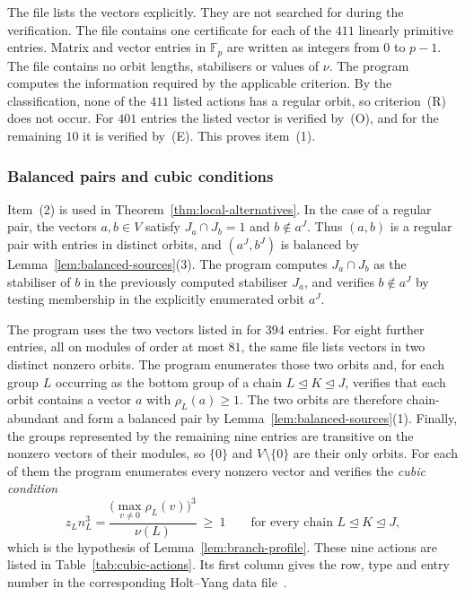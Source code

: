 \documentclass[10pt]{amsart}
\theoremstyle{definition}
\renewcommand{\ge}{\geqslant}
\renewcommand{\geq}{\geqslant}
\let\oldendproof\endproof
\renewenvironment{proof}[1][\proofname]{%
  \oldproof[\bfseries #1]%
}{\oldendproof}
\numberwithin{equation}{section}
\numberwithin{table}{section}
\begin{document}
\begin{proof}
The file  lists the vectors explicitly. They are
not searched for during the verification. The file contains one certificate for
each of the $411$ linearly primitive entries. Matrix and
vector entries in $\mathbb{F}_p$ are written as integers from $0$ to $p-1$.
The file contains no orbit lengths, stabilisers or values of
$\nu$. The program computes the information required by the applicable
criterion.
By the classification, none of the $411$ listed actions has a
regular orbit, so criterion~(R) does not occur. For $401$ entries the listed vector is
verified by~(O), and for the remaining $10$ it is verified by~(E). This proves
item~(1).

\subsubsection*{Balanced pairs and cubic conditions}
Item~(2) is used in Theorem~\ref{thm:local-alternatives}. In the case of a regular pair, the vectors
$a,b\in V$ satisfy $J_a\cap J_b=1$ and $b\notin a^{J}$.
Thus $(a,b)$ is a regular pair with entries in distinct orbits, and
$(a^J,b^J)$ is balanced by Lemma~\ref{lem:balanced-sources}(3). The program
computes $J_a\cap J_b$ as the stabiliser of
$b$ in the previously computed stabiliser $J_a$, and verifies $b\notin a^J$
by testing membership in the explicitly
enumerated orbit $a^J$.
\begin{sloppypar}
The program uses the two vectors listed in
 for $394$ entries. For eight
further entries, all on modules of order at most $81$, the same file lists
vectors in two distinct nonzero orbits. The program
enumerates those two orbits and, for each group $L$ occurring as the bottom
group of a chain $L\trianglelefteq K\trianglelefteq J$, verifies that each
orbit contains a vector $a$ with $\rho_L(a)\geq1$. The two orbits are therefore
chain-abundant and form a balanced pair by
Lemma~\ref{lem:balanced-sources}(1). Finally, the groups represented by the
remaining nine entries are transitive on the nonzero vectors of their modules, so
$\{0\}$ and $V\setminus\{0\}$ are their only orbits. For each of them the
program enumerates every nonzero vector and verifies the \emph{cubic condition}
$$
  z_Ln_L^{3}=\frac{\bigl(\max_{v\ne0}\rho_L(v)\bigr)^{3}}{\nu(L)}\ \ge\ 1
  \qquad\text{for every chain } L\trianglelefteq K\trianglelefteq J,
$$
which is the hypothesis of Lemma~\ref{lem:branch-profile}. These nine actions
are listed in
Table~\ref{tab:cubic-actions}. Its first column gives the row, type
and entry number in the corresponding Holt--Yang data file~\cite{HY23}.

\end{sloppypar}
\end{proof}
\end{document}
